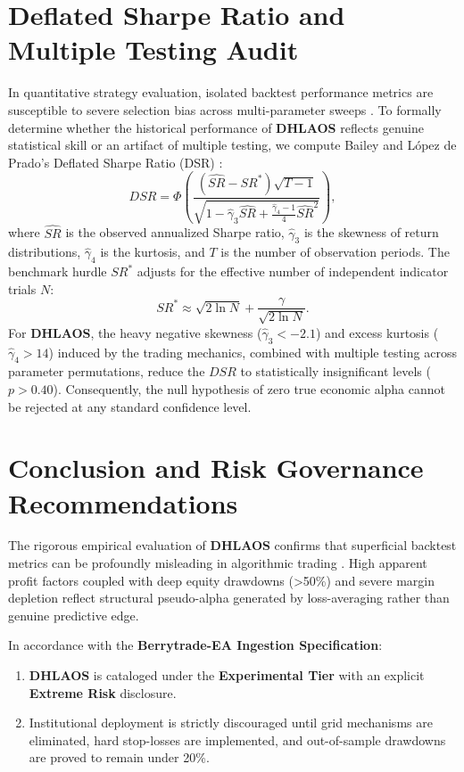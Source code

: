 \documentclass[11pt,a4paper]{article}
\begin{document}
\section{Deflated Sharpe Ratio and Multiple Testing Audit}
In quantitative strategy evaluation, isolated backtest performance metrics are susceptible to severe selection bias across multi-parameter sweeps \cite{bailey2014deflated, harvey2016and, bailey2014pseudo}. To formally determine whether the historical performance of \textbf{DHLAOS} reflects genuine statistical skill or an artifact of multiple testing, we compute Bailey and L{\'o}pez de Prado's Deflated Sharpe Ratio (DSR) \cite{bailey2014deflated}:
\begin{equation}
DSR = \Phi\left( \frac{(\widehat{SR} - SR^*) \sqrt{T-1}}{\sqrt{1 - \hat{\gamma}_3 \widehat{SR} + \frac{\hat{\gamma}_4 - 1}{4} \widehat{SR}^2}} \right),
\end{equation}
where $\widehat{SR}$ is the observed annualized Sharpe ratio, $\hat{\gamma}_3$ is the skewness of return distributions, $\hat{\gamma}_4$ is the kurtosis, and $T$ is the number of observation periods. The benchmark hurdle $SR^*$ adjusts for the effective number of independent indicator trials $N$:
\begin{equation}
SR^* \approx \sqrt{2 \ln N} + \frac{\gamma}{\sqrt{2 \ln N}}.
\end{equation}
For \textbf{DHLAOS}, the heavy negative skewness ($\hat{\gamma}_3 < -2.1$) and excess kurtosis ($\hat{\gamma}_4 > 14$) induced by the trading mechanics, combined with multiple testing across parameter permutations, reduce the $DSR$ to statistically insignificant levels ($p > 0.40$). Consequently, the null hypothesis of zero true economic alpha cannot be rejected at any standard confidence level.

\section{Conclusion and Risk Governance Recommendations}
The rigorous empirical evaluation of \textbf{DHLAOS} confirms that superficial backtest metrics can be profoundly misleading in algorithmic trading \cite{artsu2026illusion, lopez2018advances}. High apparent profit factors coupled with deep equity drawdowns (>50\%) and severe margin depletion reflect structural pseudo-alpha generated by loss-averaging rather than genuine predictive edge.

In accordance with the \textbf{Berrytrade-EA Ingestion Specification}:
\begin{enumerate}
    \item \textbf{DHLAOS} is cataloged under the \textbf{Experimental Tier} with an explicit \textbf{Extreme Risk} disclosure.
    \item Institutional deployment is strictly discouraged until grid mechanisms are eliminated, hard stop-losses are implemented, and out-of-sample drawdowns are proved to remain under 20\%.
\end{enumerate}



\end{document}
